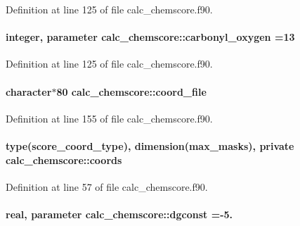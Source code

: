 Definition at line 125 of file calc\-\_\-chemscore.\-f90.

\hypertarget{classcalc__chemscore_a9da5d81c112c26d8c8911ad5c100be1b}{
\paragraph[{carbonyl\-\_\-oxygen}]{\setlength{\rightskip}{0pt plus 5cm}integer, parameter calc\-\_\-chemscore\-::carbonyl\-\_\-oxygen =13}}\label{classcalc__chemscore_a9da5d81c112c26d8c8911ad5c100be1b}


Definition at line 125 of file calc\-\_\-chemscore.\-f90.

\hypertarget{classcalc__chemscore_a7e693ad770c136c0edc287994e1f44e2}{
\paragraph[{coord\-\_\-file}]{\setlength{\rightskip}{0pt plus 5cm}character$\ast$80 calc\-\_\-chemscore\-::coord\-\_\-file}}\label{classcalc__chemscore_a7e693ad770c136c0edc287994e1f44e2}


Definition at line 155 of file calc\-\_\-chemscore.\-f90.

\hypertarget{classcalc__chemscore_ab1a63356a1ac975b5dd189e550e7e143}{
\paragraph[{coords}]{\setlength{\rightskip}{0pt plus 5cm}type({\bf score\-\_\-coord\-\_\-type}), dimension({\bf max\-\_\-masks}), private calc\-\_\-chemscore\-::coords\hspace{0.3cm}{\ttfamily [private]}}}\label{classcalc__chemscore_ab1a63356a1ac975b5dd189e550e7e143}


Definition at line 57 of file calc\-\_\-chemscore.\-f90.

\hypertarget{classcalc__chemscore_a0700bbed17560b18c8a68cc8ede74f5e}{
\paragraph[{dgconst}]{\setlength{\rightskip}{0pt plus 5cm}real, parameter calc\-\_\-chemscore\-::dgconst =-\/5.}}\label{classcalc__chemscore_a0700bbed17560b18c8a68cc8ede74f5e}



